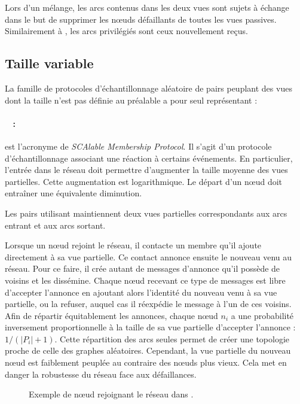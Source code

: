 \noindent Lors d'un mélange, les arcs contenus dans les deux vues sont sujets à
échange dans le but de supprimer les nœuds défaillants de toutes les vues
passives. Similairement à \CYCLON, les arcs privilégiés sont ceux nouvellement
reçus.


\subsection{Taille variable}
\label{net:subsec:variable}

La famille de protocoles d'échantillonnage aléatoire de pairs peuplant des vues
dont la taille n'est pas définie au préalable a pour seul représentant :

\paragraph{\SCAMP~\cite{ganesh2001scamp, ganesh2003peer} :} est l'acronyme de
\emph{SCAlable Membership Protocol}. Il s'agit d'un protocole d'échantillonnage
associant une réaction à certains événements. En particulier, l'entrée dans le
réseau doit permettre d'augmenter la taille moyenne des vues partielles. Cette
augmentation est logarithmique. Le départ d'un nœud doit entraîner une
équivalente diminution.

\noindent Les pairs utilisant \SCAMP maintiennent deux vues partielles
correspondants aux arcs entrant et aux arcs sortant.

\noindent Lorsque un nœud rejoint le réseau, il contacte un membre qu'il ajoute
directement à sa vue partielle. Ce contact annonce ensuite le nouveau venu au
réseau. Pour ce faire, il crée autant de messages d'annonce qu'il possède de
voisins et les dissémine. Chaque nœud recevant ce type de messages est libre
d'accepter l'annonce en ajoutant alors l'identité du nouveau venu à sa vue
partielle, ou la refuser, auquel cas il réexpédie le message à l'un de ces
voisins. Afin de répartir équitablement les annonces, chaque nœud $n_i$ a une
probabilité inversement proportionnelle à la taille de sa vue partielle
d'accepter l'annonce : $1/(|P_i|+1)$. Cette répartition des arcs seules permet
de créer une topologie proche de celle des graphes aléatoires. Cependant, la vue
partielle du nouveau nœud est faiblement peuplée au contraire des nœuds plus
vieux. Cela met en danger la robustesse du réseau face aux défaillances.

\begin{figure}
  \centering
  
  \caption[Entrée dans un réseau dans \SCAMP]
  {\label{net:fig:scampexample} Exemple de nœud rejoignant le réseau dans
    \SCAMP.}
\end{figure}

